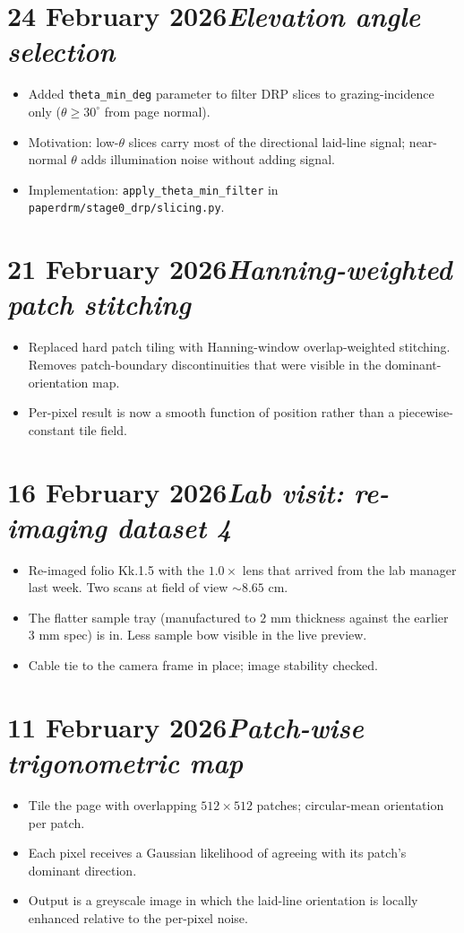 \documentclass[11pt,a4paper]{article}
\newcommand{\logentry}[2]{\section*{#1\hfill\normalfont\normalsize\textit{#2}}}
\begin{document}
\logentry{24 February 2026}{Elevation angle selection}
\begin{itemize}
  \item Added \texttt{theta\_min\_deg} parameter to filter DRP slices to grazing-incidence only ($\theta \geq 30^\circ$ from page normal).
  \item Motivation: low-$\theta$ slices carry most of the directional laid-line signal; near-normal $\theta$ adds illumination noise without adding signal.
  \item Implementation: \texttt{apply\_theta\_min\_filter} in \texttt{paperdrm/stage0\_drp/slicing.py}.
\end{itemize}

\logentry{21 February 2026}{Hanning-weighted patch stitching}
\begin{itemize}
  \item Replaced hard patch tiling with Hanning-window overlap-weighted stitching. Removes patch-boundary discontinuities that were visible in the dominant-orientation map.
  \item Per-pixel result is now a smooth function of position rather than a piecewise-constant tile field.
\end{itemize}

\logentry{16 February 2026}{Lab visit: re-imaging dataset 4}
\begin{itemize}
  \item Re-imaged folio Kk.1.5 with the $1.0\times$ lens that arrived from the lab manager last week. Two scans at field of view $\sim 8.65$ cm.
  \item The flatter sample tray (manufactured to $2$ mm thickness against the earlier $3$ mm spec) is in. Less sample bow visible in the live preview.
  \item Cable tie to the camera frame in place; image stability checked.
\end{itemize}

\logentry{11 February 2026}{Patch-wise trigonometric map}
\begin{itemize}
  \item Tile the page with overlapping $512 \times 512$ patches; circular-mean orientation per patch.
  \item Each pixel receives a Gaussian likelihood of agreeing with its patch's dominant direction.
  \item Output is a greyscale image in which the laid-line orientation is locally enhanced relative to the per-pixel noise.
\end{itemize}
\end{document}
